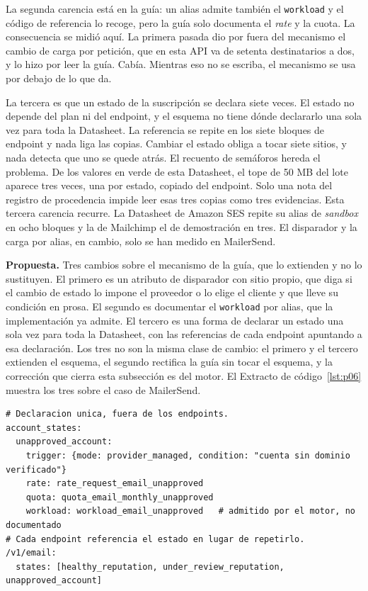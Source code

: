 La segunda carencia está en la guía: un alias admite también el
\texttt{workload} y el código de referencia lo recoge, pero la guía solo
documenta el \textit{rate} y la cuota. La consecuencia se midió aquí. La primera
pasada dio por fuera del mecanismo el cambio de carga por petición, que en esta API
va de setenta destinatarios a dos, y lo hizo por leer la guía. Cabía.
Mientras eso no se escriba, el mecanismo se usa por debajo de lo que da.

La tercera es que un estado de la suscripción se declara siete veces.
El estado no depende del plan ni del endpoint, y el esquema no tiene dónde declararlo una sola vez para toda la Datasheet.
La referencia se repite en los siete bloques de endpoint y nada liga las copias.
Cambiar el estado obliga a tocar siete sitios, y nada detecta que uno se quede atrás.
El recuento de semáforos hereda el problema.
De los valores en verde de esta Datasheet, el tope de 50 MB del lote aparece tres veces, una por estado, copiado del endpoint.
Solo una nota del registro de procedencia impide leer esas tres copias como tres evidencias.
Esta tercera carencia recurre.
La Datasheet de Amazon SES repite su alias de \textit{sandbox} en ocho bloques y la de Mailchimp el de demostración en tres.
El disparador y la carga por alias, en cambio, solo se han medido en MailerSend.

\textbf{Propuesta.} Tres cambios sobre el mecanismo de la guía, que lo extienden y
no lo sustituyen. El primero es un atributo de disparador con sitio propio, que
diga si el cambio de estado lo impone el proveedor o lo elige el cliente y que
lleve su condición en prosa. El segundo es documentar el \texttt{workload} por
alias, que la implementación ya admite. El tercero es una forma de declarar un
estado una sola vez para toda la Datasheet, con las referencias de cada endpoint
apuntando a esa declaración. Los tres no son la misma clase de cambio: el primero y
el tercero extienden el esquema, el segundo rectifica la guía sin tocar el esquema,
y la corrección que cierra esta subsección es del motor. El Extracto de
código~\ref{lst:p06} muestra los tres sobre el caso de MailerSend.

\begin{lstlisting}[style=datasheetyaml,caption={P-06: los estados de la suscripción y de la reputación declarados una vez, con su disparador y con la carga por petición que la guía no documenta (caso MailerSend).},label={lst:p06}]
# Declaracion unica, fuera de los endpoints.
account_states:
  unapproved_account:
    trigger: {mode: provider_managed, condition: "cuenta sin dominio verificado"}
    rate: rate_request_email_unapproved
    quota: quota_email_monthly_unapproved
    workload: workload_email_unapproved   # admitido por el motor, no documentado
# Cada endpoint referencia el estado en lugar de repetirlo.
/v1/email:
  states: [healthy_reputation, under_review_reputation, unapproved_account]
\end{lstlisting}

